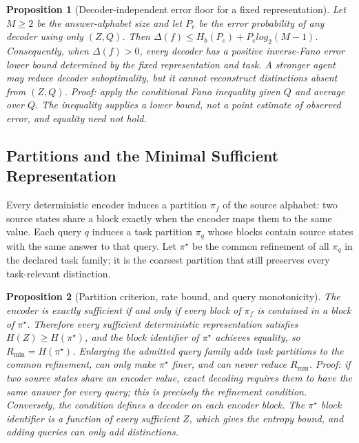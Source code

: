 \documentclass[11pt]{article}
\newtheorem{proposition}{Proposition}
\begin{document}
\begin{proposition}[Decoder-independent error floor for a fixed representation]
Let $M\geq2$ be the answer-alphabet size and let $P_e$ be the error probability of any decoder using only $(Z,Q)$. Then $\Delta(f)\leq H_b(P_e)+P_e log_2(M-1)$. Consequently, when $\Delta(f)>0$, every decoder has a positive inverse-Fano error lower bound determined by the fixed representation and task. A stronger agent may reduce decoder suboptimality, but it cannot reconstruct distinctions absent from $(Z,Q)$. Proof: apply the conditional Fano inequality given $Q$ and average over $Q$. The inequality supplies a lower bound, not a point estimate of observed error, and equality need not hold.
\end{proposition}

\subsection{Partitions and the Minimal Sufficient Representation}

Every deterministic encoder induces a partition $\pi_f$ of the source alphabet: two source states share a block exactly when the encoder maps them to the same value. Each query $q$ induces a task partition $\pi_q$ whose blocks contain source states with the same answer to that query. Let $\pi^\star$ be the common refinement of all $\pi_q$ in the declared task family; it is the coarsest partition that still preserves every task-relevant distinction.

\begin{proposition}[Partition criterion, rate bound, and query monotonicity]
The encoder is exactly sufficient if and only if every block of $\pi_f$ is contained in a block of $\pi^\star$. Therefore every sufficient deterministic representation satisfies $H(Z)\geq H(\pi^\star)$, and the block identifier of $\pi^\star$ achieves equality, so $R_{\min}=H(\pi^\star)$. Enlarging the admitted query family adds task partitions to the common refinement, can only make $\pi^\star$ finer, and can never reduce $R_{\min}$. Proof: if two source states share an encoder value, exact decoding requires them to have the same answer for every query; this is precisely the refinement condition. Conversely, the condition defines a decoder on each encoder block. The $\pi^\star$ block identifier is a function of every sufficient $Z$, which gives the entropy bound, and adding queries can only add distinctions.
\end{proposition}
\end{document}
